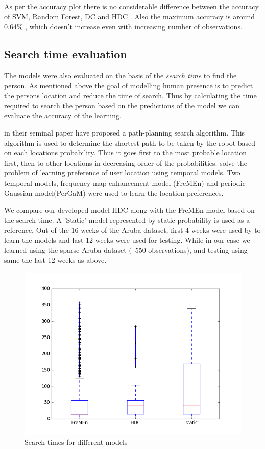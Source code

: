 As per the accuracy plot there is no considerable difference between the accuracy of  SVM, Random Forest, DC and HDC . Also the maximum accuracy is around 0.64\% , which doesn’t increase even with increasing number of observations. 


\subsection{Search time evaluation}
The models were also evaluated on the basis of the \emph{search time} to find the person. As mentioned above the goal of modelling human presence is to predict the persons location and reduce the time of search. Thus by calculating the time required to search the person based on the predictions of the model we can evaluate the accuracy of the learning.

\cite{krajnik_wheres_2015} in their seminal paper have proposed a path-planning search algorithm. This algorithm is used to determine the shortest path to be taken by the robot based on each locations probability. Thus it goes first to the most probable location first, then to other locations in decreasing order of the probabilities. \cite{krajnik_wheres_2015} solve the problem of learning preference of user location using temporal models. Two temporal models, frequency map enhancement  model (FreMEn) and periodic Gaussian model(PerGaM) were used to learn the location preferences. 

We compare our developed model HDC along-with the FreMEn model based on the search time. A 'Static' model represented by static probability is used as a reference. Out of the 16 weeks of the Aruba dataset, first 4 weeks were used by \cite{krajnik_wheres_2015} to learn the models and last 12 weeks were used for testing. While in our case we learned using the sparse Aruba dataset (~550 observations), and testing using same the last 12 weeks as above.

\begin{figure}[htp]
\centering
\includegraphics[width=\textwidth]{images/box_plot_fremen_hdc.png}
\caption[Search time evaluation]{Search times for different models}
\label{fig:search_time}
\end{figure}

